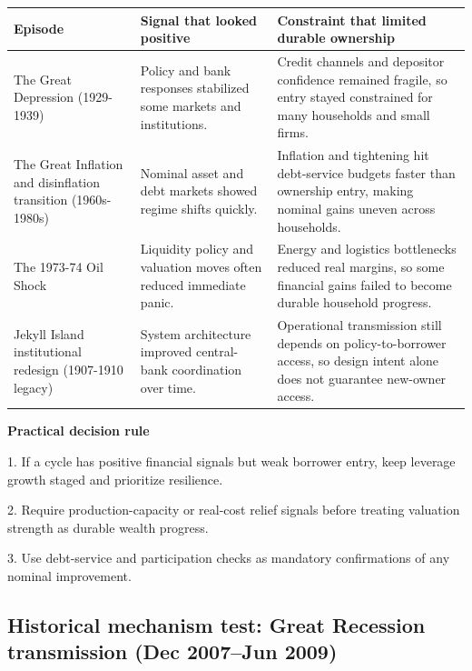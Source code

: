 \documentclass[11pt,openany]{book}
\begin{document}
\begin{center}
\small
\begin{tabularx}{\textwidth}{>{\raggedright\arraybackslash}p{}>{\raggedright\arraybackslash}p{}X}
\toprule
\textbf{Episode} & \textbf{Signal that looked positive} & \textbf{Constraint that limited durable ownership} \\
\midrule
The Great Depression (1929-1939) & Policy and bank responses stabilized some markets and institutions. & Credit channels and depositor confidence remained fragile, so entry stayed constrained for many households and small firms. \\
The Great Inflation and disinflation transition (1960s-1980s) & Nominal asset and debt markets showed regime shifts quickly. & Inflation and tightening hit debt-service budgets faster than ownership entry, making nominal gains uneven across households. \\
The 1973-74 Oil Shock & Liquidity policy and valuation moves often reduced immediate panic. & Energy and logistics bottlenecks reduced real margins, so some financial gains failed to become durable household progress. \\
Jekyll Island institutional redesign (1907-1910 legacy) & System architecture improved central-bank coordination over time. & Operational transmission still depends on policy-to-borrower access, so design intent alone does not guarantee new-owner access. \\
\bottomrule
\end{tabularx}
\normalsize
\end{center}

\begin{notebox}
\textbf{Practical decision rule}\par
1. If a cycle has positive financial signals but weak borrower entry, keep leverage growth staged and prioritize resilience.\par
2. Require production-capacity or real-cost relief signals before treating valuation strength as durable wealth progress.\par
3. Use debt-service and participation checks as mandatory confirmations of any nominal improvement.
\end{notebox}

\subsection{Historical mechanism test: Great Recession transmission (Dec 2007--Jun 2009)}
\label{subsec:great-recession-mechanism}
\end{document}
